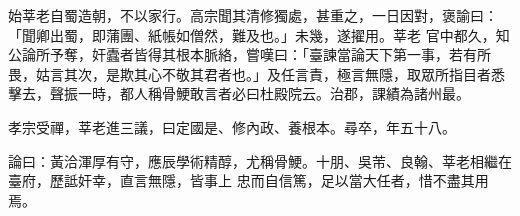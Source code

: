 \begin{pinyinscope}
 始莘老自蜀造朝，不以家行。高宗聞其清修獨處，甚重之，一日因對，褒諭曰：「聞卿出蜀，即蒲團、紙帳如僧然，難及也。」未幾，遂擢用。莘老
 官中都久，知公論所予奪，奸蠹者皆得其根本脈絡，嘗嘆曰：「臺諫當論天下第一事，若有所畏，姑言其次，是欺其心不敬其君者也。」及任言責，極言無隱，取眾所指目者悉擊去，聲振一時，都人稱骨鯁敢言者必曰杜殿院云。治郡，課績為諸州最。



 孝宗受禪，莘老進三議，曰定國是、修內政、養根本。尋卒，年五十八。



 論曰：黃洽渾厚有守，應辰學術精醇，尤稱骨鯁。十朋、吳芾、良翰、莘老相繼在臺府，歷詆奸幸，直言無隱，皆事上
 忠而自信篤，足以當大任者，惜不盡其用焉。



\end{pinyinscope}